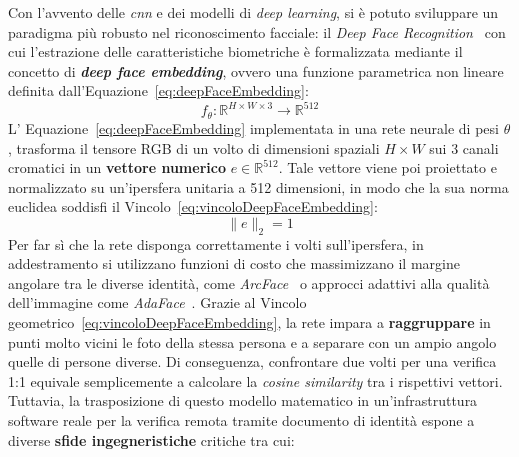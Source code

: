 Con l'avvento delle \textit{\gls{cnn}} e dei modelli di \textit{deep learning}, si è potuto sviluppare un paradigma più robusto nel riconoscimento facciale: il \textit{Deep Face Recognition}~\cite{sanzGoverningPrivacyPreservingFace2026} con cui l'estrazione delle caratteristiche biometriche è formalizzata mediante il concetto di \textbf{\textit{deep face embedding}}, ovvero una funzione parametrica non lineare~\cite{georgeLightweightCrossSpectralFace2026} definita dall'Equazione~\eqref{eq:deepFaceEmbedding}:
\begin{equation}
    \label{eq:deepFaceEmbedding}
    f_\theta: \mathbb{R}^{H \times W \times 3} \rightarrow \mathbb{R}^{512}
\end{equation}
L' Equazione~\eqref{eq:deepFaceEmbedding} implementata in una rete neurale di pesi $\theta$, trasforma il tensore RGB di un volto di dimensioni spaziali $H \times W$ sui 3 canali cromatici in un \textbf{vettore numerico} $e \in \mathbb{R}^{512}$. Tale vettore viene poi proiettato e normalizzato su un'ipersfera unitaria a 512 dimensioni, in modo che la sua norma euclidea soddisfi il Vincolo~\eqref{eq:vincoloDeepFaceEmbedding}:
\begin{equation}
    \label{eq:vincoloDeepFaceEmbedding}
    \lVert e \rVert_2 = 1
\end{equation}
Per far sì che la rete disponga correttamente i volti sull'ipersfera, in addestramento si utilizzano funzioni di costo che massimizzano il margine angolare tra le diverse identità, come \textit{ArcFace}~\cite{dengArcFaceAdditiveAngular2022} o approcci adattivi alla qualità dell'immagine come \textit{AdaFace}~\cite{kimAdaFaceQualityAdaptive2023}. Grazie al Vincolo geometrico~\eqref{eq:vincoloDeepFaceEmbedding}, la rete impara a \textbf{raggruppare} in punti molto vicini le foto della stessa persona e a separare con un ampio angolo quelle di persone diverse. 
Di conseguenza, confrontare due volti per una verifica 1:1 equivale semplicemente a calcolare la \textit{cosine similarity} tra i rispettivi vettori.
Tuttavia, la trasposizione di questo modello matematico in un'infrastruttura software reale per la verifica remota tramite documento di identità espone a diverse \textbf{sfide ingegneristiche} critiche tra cui:
